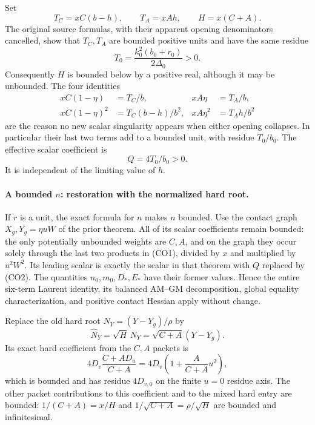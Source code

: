 Set
\[
 T_C=xC(b-h),\qquad T_A=xAh,\qquad H=x(C+A).
\]
The original source formulas, with their apparent opening denominators
cancelled, show that $T_C,T_A$ are bounded positive units and have the
same residue
\[
 T_0=\frac{k_0^2(b_0+r_0)}{2\Delta_0}>0.
\]
Consequently $H$ is bounded below by a positive real, although it may
be unbounded.  The four identities
\begin{align*}
 xC(1-\eta)&=T_C/b,&xA\eta&=T_A/b,\\
 xC(1-\eta)^2&=T_C(b-h)/b^2,&
 xA\eta^2&=T_Ah/b^2                                      \tag{CO1}
\end{align*}
are the reason no new scalar singularity appears when either opening
collapses.  In particular their last two terms add to a bounded unit,
with residue $T_0/b_0$.  The effective scalar coefficient is
\[
                         Q=4T_0/b_0>0.                  \tag{CO2}
\]
It is independent of the limiting value of $h$.

\paragraph{A bounded $n$: restoration with the normalized hard root.}
If $r$ is a unit, the exact formula for $n$ makes $n$ bounded.  Use the
contact graph $X_g,Y_g=\eta uW$ of the prior theorem.  All of its scalar
coefficients remain bounded: the only potentially unbounded weights
are $C,A$, and on the graph they occur solely through the last two
products in (CO1), divided by $x$ and multiplied by $u^2W^2$.
Its leading scalar is exactly the scalar in that theorem with $Q$
replaced by (CO2).  The quantities $n_0,m_0,D_*,E_*$ have their former
values.  Hence the entire six-term Laurent identity, its balanced
AM--GM decomposition, global equality characterization, and positive
contact Hessian apply without change.

Replace the old hard root $N_Y=(Y-Y_g)/\rho$ by
\[
        \widehat N_Y=\sqrt H\,N_Y=\sqrt{C+A}(Y-Y_g).
                                                               \tag{CO3}
\]
Its exact hard coefficient from the $C,A$ packets is
\[
             4D_v\frac{C+AD_u}{C+A}
       =4D_v\left(1+\frac{A}{C+A}u^2\right),             \tag{CO4}
\]
which is bounded and has residue $4D_{v,0}$ on the finite $u=0$
residue axis.  The other packet contributions to this coefficient
and to the mixed hard entry are bounded: $1/(C+A)=x/H$ and
$1/\sqrt{C+A}=\rho/\sqrt H$ are bounded and infinitesimal.


